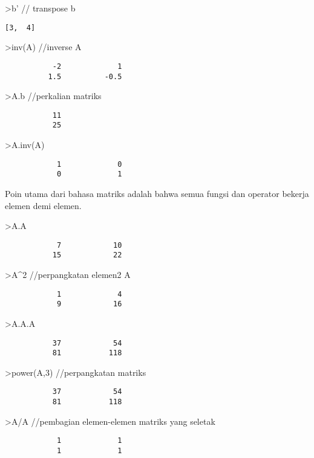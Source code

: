 \documentclass[
]{book}
\begin{document}
\textgreater b' // transpose b

\begin{verbatim}
[3,  4]
\end{verbatim}

\textgreater inv(A) //inverse A

\begin{verbatim}
           -2             1 
          1.5          -0.5 
\end{verbatim}

\textgreater A.b //perkalian matriks

\begin{verbatim}
           11 
           25 
\end{verbatim}

\textgreater A.inv(A)

\begin{verbatim}
            1             0 
            0             1 
\end{verbatim}

Poin utama dari bahasa matriks adalah bahwa semua fungsi dan operator bekerja elemen demi elemen.

\textgreater A.A

\begin{verbatim}
            7            10 
           15            22 
\end{verbatim}

\textgreater A\^{}2 //perpangkatan elemen2 A

\begin{verbatim}
            1             4 
            9            16 
\end{verbatim}

\textgreater A.A.A

\begin{verbatim}
           37            54 
           81           118 
\end{verbatim}

\textgreater power(A,3) //perpangkatan matriks

\begin{verbatim}
           37            54 
           81           118 
\end{verbatim}

\textgreater A/A //pembagian elemen-elemen matriks yang seletak

\begin{verbatim}
            1             1 
            1             1 
\end{verbatim}
\end{document}
